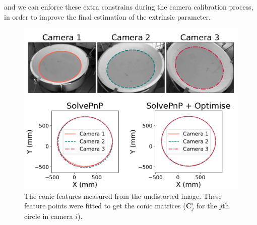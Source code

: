 \documentclass[11pt,twoside]{report}
\begin{document}
\noindent and we can enforce these extra constrains during the camera calibration process, in order to improve the final estimation of the extrinsic parameter.

\begin{figure}
  \includegraphics[width=1\linewidth,outer]{conic-3d}
  \caption[Conic optimisation for the camera calibration]{The conic features measured from the undistorted image. These feature points were fitted to get the conic matrices ($\mathbf{C}_{j}^{i}$ for the $j$th circle in camera $i$).}
  \label{fig:conic}
\end{figure}
\end{document}
